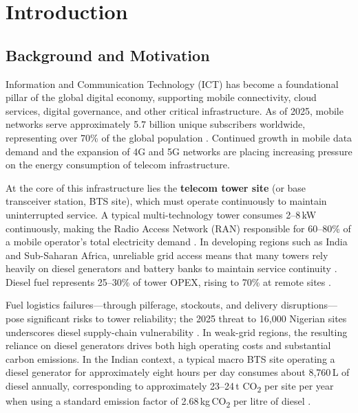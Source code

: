 \chapter{Introduction}
\label{chap:introduction}

\section{Background and Motivation}

Information and Communication Technology (ICT) has become a foundational
pillar of the global digital economy, supporting mobile connectivity, cloud
services, digital governance, and other critical infrastructure. As of 2025,
mobile networks serve approximately 5.7 billion unique subscribers
worldwide, representing over 70\% of the global population
\citep{gsma2025_mobile_economy}. Continued growth in mobile data demand and
the expansion of 4G and 5G networks are placing increasing pressure on the
energy consumption of telecom infrastructure.

At the core of this infrastructure lies the \textbf{telecom tower site} (or
base transceiver station, BTS site), which must operate continuously to
maintain uninterrupted service. A typical multi-technology tower consumes
2--8\,kW continuously, making the Radio Access Network (RAN) responsible for
60--80\% of a mobile operator's total electricity demand
\citep{americas2023_energy_efficiency}. In developing regions such as India
and Sub-Saharan Africa, unreliable grid access means that many towers rely
heavily on diesel generators and battery banks to maintain service continuity
\citep{gsma2020_tower_esco}. Diesel fuel represents 25--30\% of tower OPEX,
rising to 70\% at remote sites \citep{datoms2024,gsma2020_tower_esco}.

Fuel logistics failures---through pilferage, stockouts, and delivery
disruptions---pose significant risks to tower reliability; the 2025 threat
to 16{,}000 Nigerian sites underscores diesel supply-chain vulnerability
\citep{datoms2024,alton2025}. In weak-grid regions, the resulting reliance
on diesel generators drives both high operating costs and substantial carbon
emissions. In the Indian context, a typical macro BTS site operating a
diesel generator for approximately eight hours per day consumes about
8{,}760\,L of diesel annually, corresponding to approximately
23--24\,t CO\textsubscript{2} per site per year when using a standard
emission factor of 2.68\,kg\,CO\textsubscript{2} per litre of diesel
\citep{trai2011_green_telecom,ghgprotocol2017_emission_factors}.

